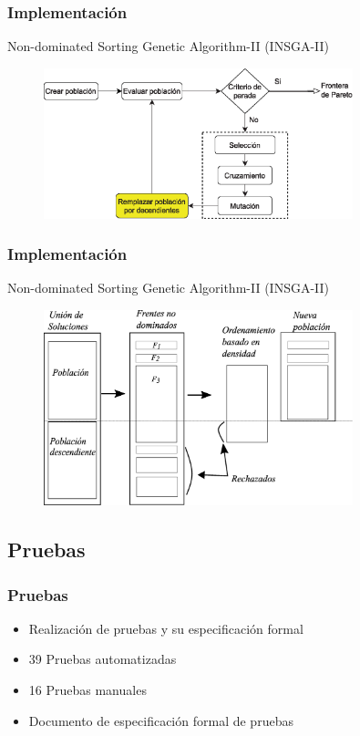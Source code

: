 \documentclass[9pt]{beamer}
\begin{document}
    \begin{frame}
        \frametitle{Implementación}                       
        Non-dominated Sorting Genetic Algorithm-II (INSGA-II)

        \begin{figure}
            \includegraphics[width=0.8\textwidth]{assets/NSGAIIFlujo.eps}
        \end{figure}

    \end{frame}

    \begin{frame}
        \frametitle{Implementación}                       
        Non-dominated Sorting Genetic Algorithm-II (INSGA-II)

        \begin{figure}
            \includegraphics[width=0.8\textwidth]{assets/NSGAII.eps}
        \end{figure}

    \end{frame}

    \subsection{Pruebas}
    \begin{frame}
        \frametitle{Pruebas}                       
        
        \begin{itemize}
            \item Realización de pruebas y su especificación formal
            \item 39 Pruebas automatizadas
            \item 16 Pruebas manuales
            \item Documento de especificación formal de pruebas
        \end{itemize}


    \end{frame}
\end{document}
